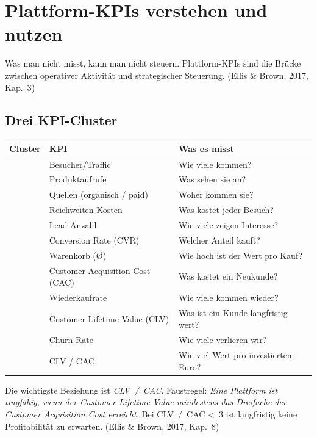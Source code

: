\documentclass[11pt,a4paper,oneside]{article}
\newcommand{\quelle}[1]{{\footnotesize\color{lpGray}(#1)}}
\begin{document}
\section{Plattform-KPIs verstehen und nutzen}

Was man nicht misst, kann man nicht steuern. Plattform-KPIs sind die Brücke zwischen operativer Aktivität und strategischer Steuerung. \quelle{Ellis \& Brown, 2017, Kap.~3}

\subsection{Drei KPI-Cluster}

\begin{tabularx}{\linewidth}{@{}>{\bfseries}lX X@{}}
\toprule
Cluster & KPI & Was es misst \\
\midrule
\multirow{4}{*}{Reichweite} & Besucher/Traffic & Wie viele kommen? \\
                            & Produktaufrufe   & Was sehen sie an? \\
                            & Quellen (organisch / paid) & Woher kommen sie? \\
                            & Reichweiten-Kosten & Was kostet jeder Besuch? \\
\midrule
\multirow{4}{*}{Conversion} & Lead-Anzahl     & Wie viele zeigen Interesse? \\
                            & Conversion Rate (CVR) & Welcher Anteil kauft? \\
                            & Warenkorb (\O) & Wie hoch ist der Wert pro Kauf? \\
                            & Customer Acquisition Cost (CAC) & Was kostet ein Neukunde? \\
\midrule
\multirow{4}{*}{Lifetime}   & Wiederkaufrate & Wie viele kommen wieder? \\
                            & Customer Lifetime Value (CLV) & Was ist ein Kunde langfristig wert? \\
                            & Churn Rate     & Wie viele verlieren wir? \\
                            & CLV / CAC      & Wie viel Wert pro investiertem Euro? \\
\bottomrule
\end{tabularx}

\medskip

\noindent Die wichtigste Beziehung ist \emph{CLV~/~CAC}. Faustregel: \emph{Eine Plattform ist tragfähig, wenn der Customer Lifetime Value mindestens das Dreifache der Customer Acquisition Cost erreicht.} Bei CLV~/~CAC \textless~3 ist langfristig keine Profitabilität zu erwarten. \quelle{Ellis \& Brown, 2017, Kap.~8}
\end{document}
